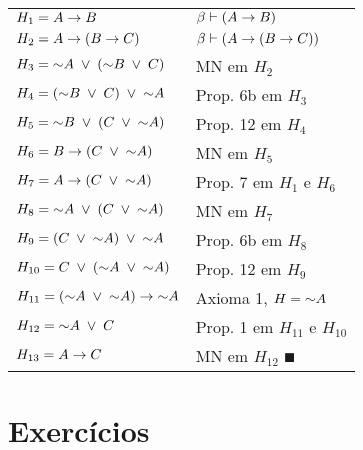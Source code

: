 \begin{tabular}{p{}p{}}
  \hline
    $H_1 = A \rightarrow B$                                           & $ \beta \vdash (A \rightarrow B)$ \\
    $H_2 = A \rightarrow (B \rightarrow C)$                                  & $ \beta \vdash ( A \rightarrow (B \rightarrow C) )$ \\
    $H_3 = \mathord{\sim} A \;\lor\; (\mathord{\sim} B \;\lor\; C)$                          & MN em $H_2$ \\
    $H_4 = (\mathord{\sim} B \;\lor\; C) \;\lor\; \mathord{\sim} A$                          & Prop. 6b em $H_3$ \\
    $H_5 = \mathord{\sim} B \;\lor\; (C \;\lor\; \mathord{\sim} A)$                          & Prop. 12 em $H_4$ \\
    $H_6 = B \rightarrow (C \;\lor\; \mathord{\sim} A)$                              & MN em $H_5$ \\
    $H_7 = A \rightarrow (C \;\lor\; \mathord{\sim} A)$                              & Prop. 7 em $H_1$ e $H_6$ \\
    $H_8 = \mathord{\sim} A \;\lor\; (C \;\lor\; \mathord{\sim} A)$                          & MN em $H_7$ \\
    $H_9 = (C \;\lor\; \mathord{\sim} A) \;\lor\; \mathord{\sim} A$                          & Prop. 6b em $H_8$ \\
    $H_{10} = C \;\lor\; (\mathord{\sim} A \;\lor\; \mathord{\sim} A)$                        & Prop. 12 em $H_9$ \\
    $H_{11} = (\mathord{\sim} A \;\lor\; \mathord{\sim} A) \rightarrow \mathord{\sim} A$                  & Axioma 1, $H = \mathord{\sim} A$ \\
    $H_{12} = \mathord{\sim} A \;\lor\; C$                                     & Prop. 1 em $H_{11}$ e $H_{10}$ \\
    $H_{13} = A \rightarrow C$                                         & MN em $H_{12}$ $\QED$ \\
  \hline
\end{tabular}


\section{Exercícios}


